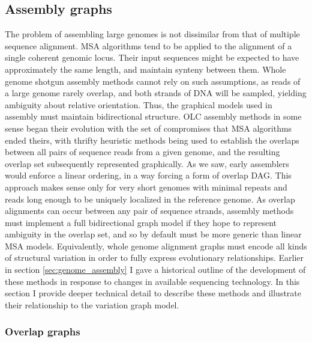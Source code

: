 \subsection{Assembly graphs}

The problem of assembling large genomes is not dissimilar from that of multiple sequence alignment.
MSA algorithms tend to be applied to the alignment of a single coherent genomic locus.
Their input sequences might be expected to have approximately the same length, and maintain synteny between them.
Whole genome shotgun assembly methods cannot rely on such assumptions, as reads of a large genome rarely overlap, and both strands of DNA will be sampled, yielding ambiguity about relative orientation.
Thus, the graphical models used in assembly must maintain bidirectional structure.
OLC assembly methods in some sense began their evolution with the set of compromises that MSA algorithms ended theirs, with thrifty heuristic methods being used to establish the overlaps between all pairs of sequence reads from a given genome, and the resulting overlap set subsequently represented graphically.
As we saw, early assemblers would enforce a linear ordering, in a way forcing a form of overlap DAG.
This approach makes sense only for very short genomes with minimal repeats and reads long enough to be uniquely localized in the reference genome.
As overlap alignments can occur between any pair of sequence strands, assembly methods must implement a full bidirectional graph model if they hope to represent ambiguity in the overlap set, and so by default must be more generic than linear MSA models.
Equivalently, whole genome alignment graphs must encode all kinds of structural variation in order to fully express evolutionary relationships.
Earlier in section \ref{sec:genome_assembly} I gave a historical outline of the development of these methods in response to changes in available sequencing technology.
In this section I provide deeper technical detail to describe these methods and illustrate their relationship to the variation graph model.

\subsubsection{Overlap graphs}
\label{sec:overlap_graphs}

